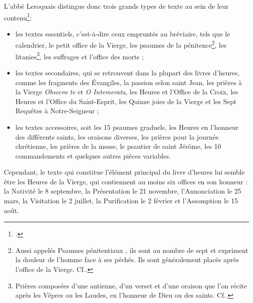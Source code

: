 \documentclass[a4paper,12pt,twoside]{book}
\begin{document}
	L'abbé Leroquais distingue donc trois grands types de texte au sein de leur contenu\footcite[p. XIV]{Leroquais_notices}:
	\begin{itemize}
	    \item les textes essentiels, c'est-à-dire ceux empruntés au bréviaire, tels que le calendrier, le petit office de la Vierge, les psaumes de la pénitence\footnote{Aussi appelés \og Psaumes pénitentiaux \fg{}, ils sont au nombre de sept et expriment la douleur de l'homme face à ses péchés. Ils sont généralement placés après l'office de la Vierge. Cf.\cite[p. XX-XXI]{Leroquais_notices}.}, les litanies\footnote{Prières composées d’une antienne, d’un verset et d’une oraison que l’on récite après les Vêpres ou les Laudes, en l’honneur de Dieu ou des saints. Cf.\cite[p. XXI]{Leroquais_notices}.}, les suffrages et l’office des morts ;
	    \item les textes secondaires, qui se retrouvent dans la plupart des livres d'heures, comme les fragments des Évangiles, la passion selon saint Jean, les prières à la Vierge \textit{Obsecro te} et \textit{O Intemerata}, les Heures et l’Office de la Croix, les Heures et l’Office du Saint-Esprit, les Quinze joies de la Vierge et les Sept Requêtes à Notre-Seigneur ;
	    \item les textes accessoires, soit les 15 psaumes graduels, les Heures en l’honneur des différents saints, les oraisons diverses, les prières pour la journée chrétienne, les prières de la messe, le psautier de saint Jérôme, les 10 commandements et quelques autres pièces variables.
	\end{itemize}
	
	Cependant, le texte qui constitue l'élément principal du livre d'heures lui semble être les Heures de la Vierge, qui contiennent au moins six offices en son honneur : la Nativité le 8 septembre, la Présentation le 21 novembre, l'Annonciation le 25 mars, la Visitation le 2 juillet, la Purification le 2 février et l'Assomption le 15 août. 
	
\end{document}

